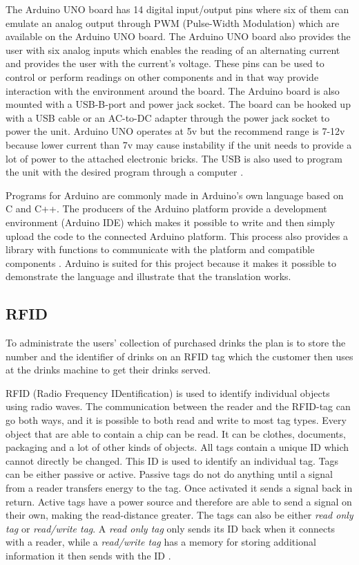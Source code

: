 The Arduino UNO board has 14 digital input/output pins where six of them can emulate an analog output through PWM (Pulse-Width Modulation) which are available on the Arduino UNO board. The Arduino UNO board also provides the user with six analog inputs which enables the reading of an alternating current and provides the user with the current's voltage. These pins can be used to control or perform readings on other components and in that way provide interaction with the environment around the board.
The Arduino board is also mounted with a USB-B-port and power jack socket. The board can be hooked up with a USB cable or an AC-to-DC adapter through the power jack socket to power the unit. Arduino UNO operates at 5v but the recommend range is 7-12v because lower current than 7v may cause instability if the unit needs to provide a lot of power to the attached electronic bricks. The USB is also used to program the unit with the desired program through a computer \citep{ArduinoUno}.

Programs for Arduino are commonly made in Arduino's own language based on C and C++. The producers of the Arduino platform provide a development environment (Arduino IDE) which makes it possible to write and then simply upload the code to the connected Arduino platform. This process also provides a library with functions to communicate with the platform and compatible components \citep{ArduinoLanguage}.
Arduino is suited for this project because it makes it possible to demonstrate the language and illustrate that the translation works.

\subsection{RFID}
\label{sec:RFID}
To administrate the users' collection of purchased drinks the plan is to store the number and the identifier of drinks on an RFID tag which the customer then uses at the drinks machine to get their drinks served.

RFID (Radio Frequency IDentification) is used to identify individual objects using radio waves.
The communication between the reader and the RFID-tag can go both ways, and it is possible to both read and write to most tag types. 
Every object that are able to contain a chip can be read. It can be clothes, documents, packaging and a lot of other kinds of objects. 
All tags contain a unique ID which cannot directly be changed. This ID is used to identify an individual tag.
Tags can be either passive or active. Passive tags do not do anything until a signal from a reader transfers energy to the tag. Once activated it sends a signal back in return. Active tags have a power source and therefore are able to send a signal on their own, making the read-distance greater.
The tags can also be either \textit{read only tag} or \textit{read/write tag}. A \textit{read only tag} only sends its ID back when it connects with a reader, while a \textit{read/write tag} has a memory for storing additional information it then sends with the ID \citep{RFID}.

